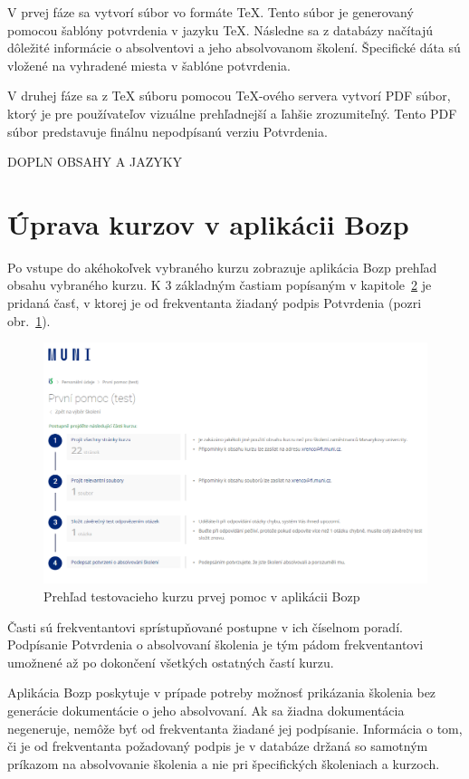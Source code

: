 \documentclass[
  digital,     %
  oneside,     %
  nosansbold,  %
  nocolorbold, %
  lof,         %
  nolot,         %
]{fithesis4}
\begin{document}
V prvej fáze sa vytvorí súbor vo formáte \TeX. Tento súbor je generovaný pomocou šablóny potvrdenia v jazyku \TeX. Následne sa z databázy načítajú dôležité informácie o absolventovi a jeho absolvovanom školení. Špecifické dáta sú vložené na vyhradené miesta v šablóne potvrdenia.

V druhej fáze sa z \TeX{} súboru pomocou \TeX-ového servera vytvorí PDF súbor, ktorý je pre používateľov vizuálne prehľadnejší a ľahšie zrozumiteľný. Tento PDF súbor predstavuje finálnu nepodpísanú verziu Potvrdenia.

DOPLN OBSAHY A JAZYKY

\section{Úprava kurzov v aplikácii Bozp}
Po vstupe do akéhokoľvek vybraného kurzu zobrazuje aplikácia Bozp prehľad obsahu vybraného kurzu. K 3 základným častiam popísaným v kapitole~\hyperref[kap-2]{2} je pridaná časť, v ktorej je od frekventanta žiadaný podpis Potvrdenia (pozri obr.~\ref{obr1}).

\begin{figure}
  \begin{center}
    \includegraphics[width=\textwidth]{prehledtestovnehokurzu.png}
  \end{center}
  \caption{Prehľad testovacieho kurzu prvej pomoc v aplikácii Bozp}
  \label{obr1}
\end{figure}

\noindent
Časti sú frekventantovi sprístupňované postupne v ich číselnom poradí.
Podpísanie Potvrdenia o absolvovaní školenia je tým pádom frekventantovi umožnené až po dokončení všetkých ostatných častí kurzu.

Aplikácia Bozp poskytuje v prípade potreby možnosť prikázania školenia bez generácie dokumentácie o jeho absolvovaní. Ak sa žiadna dokumentácia negeneruje, nemôže byť od frekventanta žiadané jej podpísanie. Informácia o tom, či je od frekventanta požadovaný podpis je v databáze držaná so samotným príkazom na absolvovanie školenia a nie pri špecifických školeniach a kurzoch.
\end{document}

